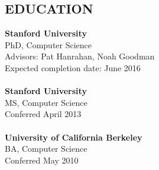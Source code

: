 \documentclass[line,margin]{res}
\begin{document}
\begin{resume}
\section{EDUCATION}
\textbf{Stanford University} \\
PhD, Computer Science \\
Advisors: Pat Hanrahan, Noah Goodman \\
Expected completion date: June 2016 \\
\\
\textbf{Stanford University} \\
MS, Computer Science \\
Conferred April 2013 \\
\\
\textbf{University of California Berkeley} \\
BA, Computer Science \\
Conferred May 2010 \\



\end{resume}
\end{document}
